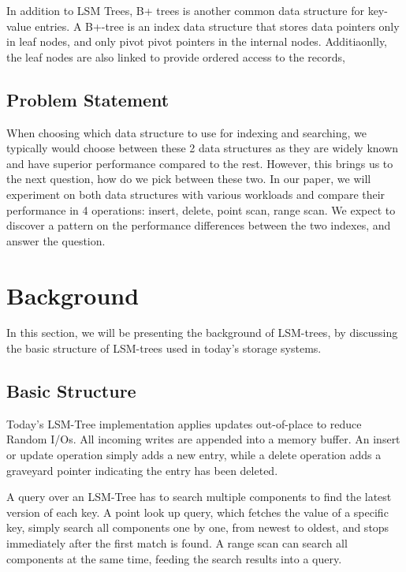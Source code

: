 \documentclass[sigconf]{acmart}
\begin{document}
    In addition to LSM Trees, B+ trees is another common data structure for key-value entries. A B+-tree is an index data structure that stores data pointers only in leaf nodes, and only pivot pivot pointers in the internal nodes. Additiaonlly, the leaf nodes are also linked to provide ordered access to the records,

    \subsection{Problem Statement}

    When choosing which data structure to use for indexing and searching, we typically would choose between these 2 data structures as they are widely known and have superior performance compared to the rest. However, this brings us to the next question, how do we pick between these two. In our paper, we will experiment on both data structures with various workloads and compare their performance in 4 operations: insert, delete, point scan, range scan. We expect to discover a pattern on the performance differences between the two indexes, and answer the question.


    \section{Background}

    In this section, we will be presenting the background of LSM-trees, by discussing the basic structure of LSM-trees used in today's storage systems.

    \subsection{Basic Structure}
    Today's LSM-Tree implementation applies updates out-of-place to reduce Random I/Os. All incoming writes are appended into a memory buffer. An insert or update operation simply adds a new entry, while a delete operation adds a graveyard pointer indicating the entry has been deleted.

    A query over an LSM-Tree has to search multiple components to find the latest version of each key. A point look up query, which fetches the value of a specific key, simply search all components one by one, from newest to oldest, and stops immediately after the first match is found. A range scan can search all components at the same time, feeding the search results into a query.
\end{document}
